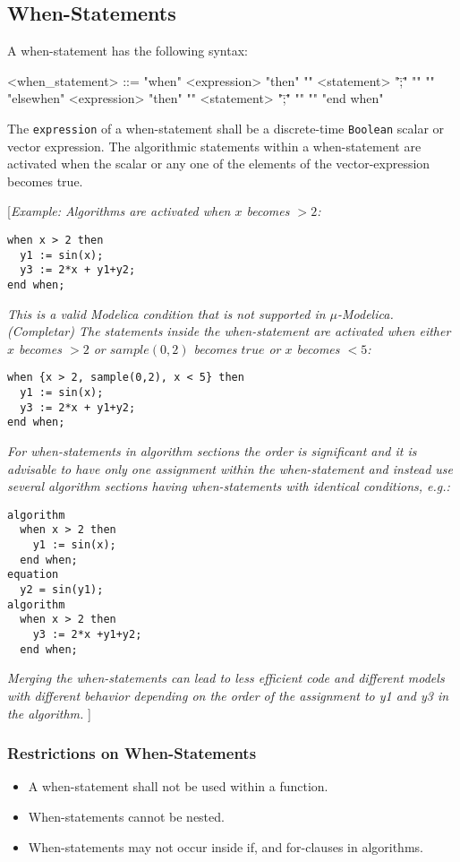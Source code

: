 \documentclass[11pt,a4paper,notitlepage]{report}
\begin{document}
\subsection{When-Statements}

A when-statement has the following syntax:

\begin{grammar}
<when_statement> ::=
"when" <expression> "then"
"{" <statement> "\";\"" "}" 
"{" "elsewhen" <expression> "then"
"{" <statement> "\";\"" "}" "}"
"end when"
\end{grammar}

The \verb"expression" of a when-statement shall be a discrete-time \verb"Boolean" scalar or vector expression. The algorithmic statements within a when-statement are activated when the scalar or any one of the elements of the
vector-expression becomes true.

[\emph{Example:
Algorithms are activated when $x$ becomes $> 2$:}
\begin{verbatim}
when x > 2 then
  y1 := sin(x);
  y3 := 2*x + y1+y2;
end when;
\end{verbatim}

\emph{This is a valid Modelica condition that is not supported in $\mu$-Modelica. (Completar)
The statements inside the when-statement are activated when either $x$ becomes $> 2$ or $sample(0,2)$ becomes $true$ or $x$ becomes $< 5$:}
\begin{verbatim}
when {x > 2, sample(0,2), x < 5} then
  y1 := sin(x);
  y3 := 2*x + y1+y2;
end when;
\end{verbatim}

\emph{For when-statements in algorithm sections the order is significant and it is advisable to have only one assignment within the when-statement and instead use several algorithm sections having when-statements with identical conditions, e.g.:}

\begin{verbatim}
algorithm
  when x > 2 then
    y1 := sin(x);
  end when;
equation
  y2 = sin(y1);
algorithm
  when x > 2 then
    y3 := 2*x +y1+y2;
  end when;
\end{verbatim}

\emph{Merging the when-statements can lead to less efficient code and different models with different behavior depending on the order of the assignment to y1 and y3 in the algorithm.}
]
\subsubsection{Restrictions on When-Statements}
\begin{itemize}
\item A when-statement shall not be used within a function.
\item When-statements cannot be nested.
\item When-statements may not occur inside if, and for-clauses in algorithms.  
\end{itemize}
\end{document}
